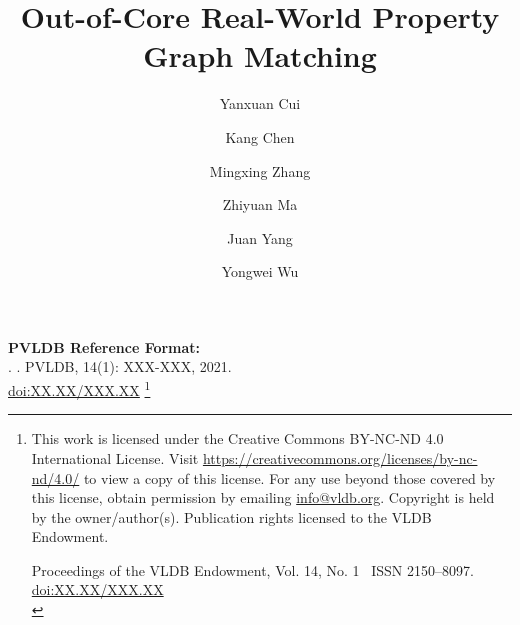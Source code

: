 \documentclass[sigconf, nonacm]{acmart}
\newcommand\vldbdoi{XX.XX/XXX.XX}
\newcommand\vldbpages{XXX-XXX}
\newcommand\vldbvolume{14}
\newcommand\vldbissue{1}
\newcommand\vldbyear{2021}
\newcommand\vldbauthors{\authors}
\newcommand\vldbtitle{\shorttitle}
\newcommand\vldbpagestyle{plain}
\begin{document}
\title{Out-of-Core Real-World Property Graph Matching}

\author{Yanxuan Cui}

\author{Kang Chen}

\author{Mingxing Zhang}

\author{Zhiyuan Ma}

\author{Juan Yang}

\author{Yongwei Wu}



\maketitle

\pagestyle{\vldbpagestyle}
\begingroup\small\noindent\raggedright\textbf{PVLDB Reference Format:}\\
\vldbauthors. \vldbtitle. PVLDB, \vldbvolume(\vldbissue): \vldbpages, \vldbyear.\\
\href{https://doi.org/\vldbdoi}{doi:\vldbdoi}
\endgroup
\begingroup
\renewcommand\thefootnote{}\footnote{\noindent
This work is licensed under the Creative Commons BY-NC-ND 4.0 International License. Visit \url{https://creativecommons.org/licenses/by-nc-nd/4.0/} to view a copy of this license. For any use beyond those covered by this license, obtain permission by emailing \href{mailto:info@vldb.org}{info@vldb.org}. Copyright is held by the owner/author\@(s). Publication rights licensed to the VLDB Endowment. \\
\raggedright{} Proceedings of the VLDB Endowment, Vol. \vldbvolume, No. \vldbissue\ %
ISSN 2150--8097. \\
\href{https://doi.org/\vldbdoi}{doi:\vldbdoi} \\
}\addtocounter{footnote}{-1}\endgroup
\end{document}
